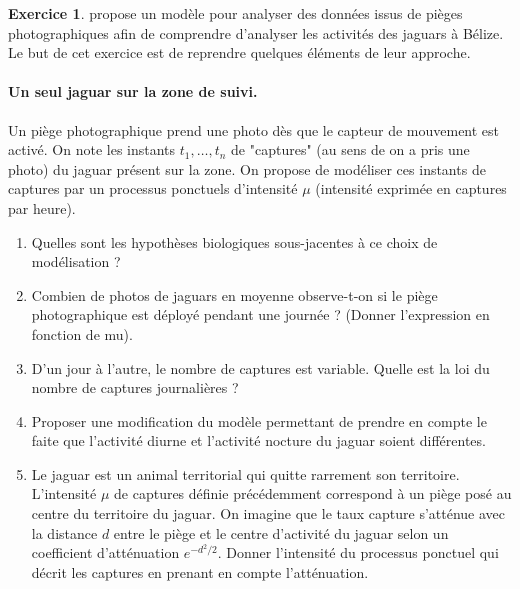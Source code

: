 \documentclass[10pt,fleqn, svgnames]{article}
\theoremstyle{definition}
\newtheorem{exo}{Exercice}
\begin{document}
\begin{exo}
\textcite{distiller2020using} propose un modèle pour analyser des données issus de pièges photographiques afin de comprendre d'analyser les activités des jaguars à Bélize. Le but de cet exercice est de reprendre quelques éléments de leur approche.

\paragraph{Un seul jaguar sur la zone de suivi.}

Un piège photographique prend une photo dès que le capteur de mouvement est activé. On note les instants $t_1, \ldots,t_n$ de "captures" (au sens de on a pris une photo) du jaguar présent sur la zone. On propose de modéliser ces instants de captures par un processus ponctuels d'intensité $\mu$ (intensité exprimée en captures par heure).

\begin{enumerate}
\item Quelles sont les hypothèses biologiques sous-jacentes à ce choix de modélisation ?
\item Combien de photos de jaguars en moyenne observe-t-on si le piège photographique est déployé pendant une journée ? (Donner l'expression en fonction de mu).
\item D'un jour à l'autre, le nombre de captures est variable. Quelle est la loi du nombre de captures journalières ?
\item Proposer une modification du modèle permettant de prendre en compte le faite que l'activité diurne et l'activité nocture du jaguar soient différentes.
\item Le jaguar est un animal territorial qui quitte rarrement son territoire. L'intensité $\mu$ de captures définie précédemment correspond à un piège posé au centre du territoire du jaguar. On imagine que le taux capture s'atténue avec la distance $d$ entre le  piège et le centre d'activité du jaguar selon un coefficient d'atténuation $e^{-d^2/2}.$ Donner l'intensité du processus ponctuel qui décrit les captures en prenant en compte l'atténuation.
\end{enumerate}  
 

\end{exo}
\end{document}
